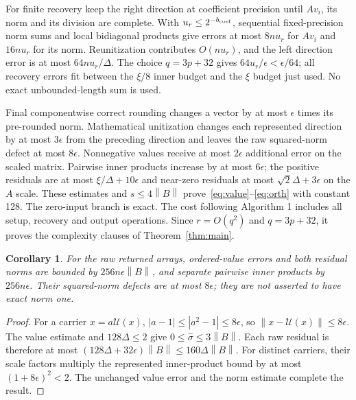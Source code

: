 \documentclass[11pt]{article}
\newtheorem{corollary}[theorem]{Corollary}
\theoremstyle{remark}\newtheorem{remark}[theorem]{Remark}
\newcommand{\norm}[1]{\left\lVert#1\right\rVert}
\newcommand{\abs}[1]{\left\lvert#1\right\rvert}
\newcommand{\unit}[1]{\mathcal U(#1)}
\begin{document}
For finite recovery keep the right direction at coefficient precision until
$Av_i$, its norm and its division are complete. With
$u_r\le2^{-b_{\rm coef}}$, sequential fixed-precision norm sums and
local bidiagonal products give errors at most $8nu_r$ for $Av_i$ and
$16nu_r$ for its norm. Reunitization contributes $O(nu_r)$, and the left
direction error is at most $64nu_r/\Delta$. The choice $q=3p+32$ gives
$64u_r/\epsilon<\epsilon/64$; all recovery errors fit between the
$\xi/8$ inner budget and the $\xi$ budget just used. No exact
unbounded-length sum is used.

Final componentwise correct rounding changes a vector by at most $\epsilon$
times its pre-rounded norm. Mathematical unitization changes each represented
direction by at most $3\epsilon$ from the preceding direction and leaves
the raw squared-norm defect at most $8\epsilon$. Nonnegative values receive
at most $2\epsilon$ additional error on the scaled matrix.
Pairwise inner products increase by at most $6\epsilon$; the positive
residuals are at most $\xi/\Delta+10\epsilon$ and near-zero residuals at
most $\sqrt2\Delta+3\epsilon$ on the $A$ scale. These estimates and
$s\le4\norm B$ prove~\eqref{eq:value}--\eqref{eq:orth} with constant 128.
The zero-input branch is exact. The cost following Algorithm 1 includes all
setup, recovery and output operations. Since $r=O(q^2)$ and $q=3p+32$,
it proves the complexity clauses of Theorem~\ref{thm:main}.

\begin{corollary}\label{cor:raw}
For the raw returned arrays, ordered-value errors and both residual norms
are bounded by $256n\epsilon\norm B$, and separate pairwise inner products
by $256n\epsilon$. Their squared-norm defects are at most $8\epsilon$;
they are not asserted to have exact norm one.
\end{corollary}
\begin{proof}
For a carrier $x=a\unit x$, $\abs{a-1}\le\abs{a^2-1}\le8\epsilon$,
so $\norm{x-\unit x}\le8\epsilon$. The value estimate and
$128\Delta\le2$ give $0\le\widehat\sigma\le3\norm B$.
Each raw residual is therefore at most
$(128\Delta+32\epsilon)\norm B\le160\Delta\norm B$.
For distinct carriers, their scale factors multiply the represented
inner-product bound by at most $(1+8\epsilon)^2<2$.
The unchanged value error and the norm estimate complete the result.
\end{proof}
\end{document}
